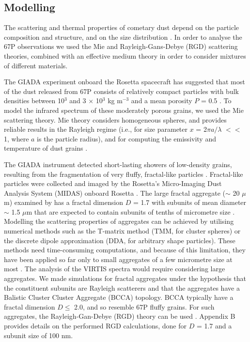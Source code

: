 \documentclass[a4paper,fleqn,usenatbib]{mnras}
\begin{document}
\subsection{Modelling}
\label{sec:model}

The scattering and thermal properties of cometary dust depend on the particle composition and structure, and on the size distribution \citep{Hanner2003,Kolokolova2004}. 
In order to analyse the 67P observations we used the Mie \citep{Mie1908} and Rayleigh-Gans-Debye (RGD) \citep[][and references therein]{Tazaki2016} scattering theories, combined with an effective medium theory in order to consider mixtures of different materials.


The GIADA experiment onboard the Rosetta spacecraft has suggested
that most of the dust released from 67P consists of relatively
compact particles with bulk densities between 10$^3$ and 3
$\times$ 10$^3$ kg m$^{-3}$  and a mean porosity $P$ = 0.5
\citep{Rotundi2015,Fulle2015,Fulle2016,Dellacorte2016}. To model
the infrared spectrum of these moderately porous grains, we used
the Mie scattering theory. Mie theory considers homogeneous
spheres, and provides reliable results in the Rayleigh regime
(i.e., for size parameter $x$ = 2$\pi a /\lambda$ $<<$ 1, where
$a$ is the particle radius), and for computing the emissivity and
temperature of dust grains \citep{Kolokolova2004}.

The GIADA instrument detected short-lasting showers of low-density
grains, resulting from the fragmentation of very fluffy,
fractal-like particles \citep{Fulle2015}. Fractal-like particles
were collected and imaged by the Rosetta's Micro-Imaging Dust
Analysis System (MIDAS) onboard Rosetta \citep{Mannel2016}. The
large fractal aggregate ($\sim$ 20 $\mu$m) examined by
\citet{Mannel2016} has a fractal dimension $D$ = 1.7 with subunits
of mean diameter $\sim$ 1.5 $\mu$m that are expected to contain
subunits of tenths of micrometre size \citep{Bentley2016}.
Modelling the scattering properties of aggregates can be achieved
by utilising numerical methods such as the T-matrix method (TMM,
for cluster spheres) or the discrete dipole approximation (DDA,
for arbitrary shape particles). These methods need time-consuming
computations, and because of this limitation, they have been
applied so far only to small aggregates of a few micrometre size
at most  \citep{Kolokolova2004,Kimura2016}. The analysis of the
VIRTIS spectra  would require considering large aggregates. We made simulations for fractal aggregates under the
hypothesis that the constituent subunits are Rayleigh scatterers
and that the aggregates have a Balistic Cluster Cluster Aggregate
(BCCA) topology. BCCA typically have a fractal dimension $D \leq$
2.0, and so resemble 67P fluffy grains. For such aggregates, the
Rayleigh-Gan-Debye (RGD) theory can be used \citep{Tazaki2016}. 
Appendix B provides details on the performed RGD calculations, done for  $D$
= 1.7 and a subunit size of 100 nm.
\end{document}

